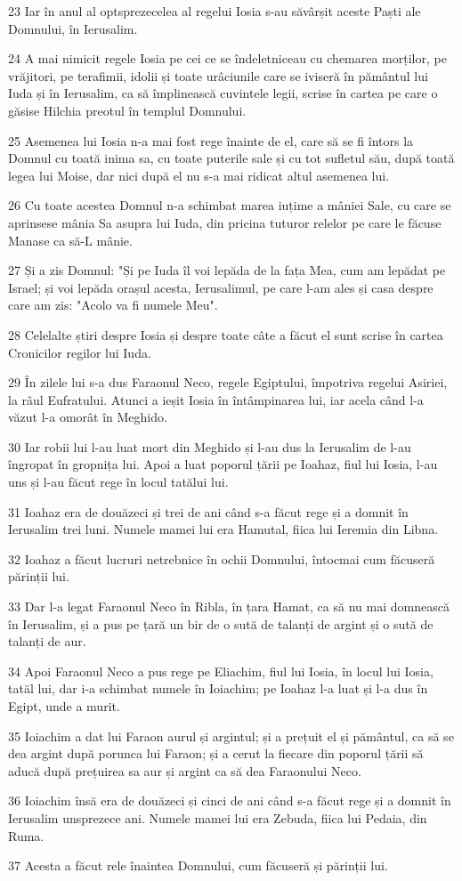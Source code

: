 \par 23 Iar în anul al optsprezecelea al regelui Iosia s-au săvârșit aceste Paști ale Domnului, în Ierusalim.
\par 24 A mai nimicit regele Iosia pe cei ce se îndeletniceau cu chemarea morților, pe vrăjitori, pe terafimii, idolii și toate urâciunile care se iviseră în pământul lui Iuda și în Ierusalim, ca să împlinească cuvintele legii, scrise în cartea pe care o găsise Hilchia preotul în templul Domnului.
\par 25 Asemenea lui Iosia n-a mai fost rege înainte de el, care să se fi întors la Domnul cu toată inima sa, cu toate puterile sale și cu tot sufletul său, după toată legea lui Moise, dar nici după el nu s-a mai ridicat altul asemenea lui.
\par 26 Cu toate acestea Domnul n-a schimbat marea iuțime a mâniei Sale, cu care se aprinsese mânia Sa asupra lui Iuda, din pricina tuturor relelor pe care le făcuse Manase ca să-L mânie.
\par 27 Și a zis Domnul: "Și pe Iuda îl voi lepăda de la fața Mea, cum am lepădat pe Israel; și voi lepăda orașul acesta, Ierusalimul, pe care l-am ales și casa despre care am zis: "Acolo va fi numele Meu".
\par 28 Celelalte știri despre Iosia și despre toate câte a făcut el sunt scrise în cartea Cronicilor regilor lui Iuda.
\par 29 În zilele lui s-a dus Faraonul Neco, regele Egiptului, împotriva regelui Asiriei, la râul Eufratului. Atunci a ieșit Iosia în întâmpinarea lui, iar acela când l-a văzut l-a omorât în Meghido.
\par 30 Iar robii lui l-au luat mort din Meghido și l-au dus la Ierusalim de l-au îngropat în gropnița lui. Apoi a luat poporul țării pe Ioahaz, fiul lui Iosia, l-au uns și l-au făcut rege în locul tatălui lui.
\par 31 Ioahaz era de douăzeci și trei de ani când s-a făcut rege și a domnit în Ierusalim trei luni. Numele mamei lui era Hamutal, fiica lui Ieremia din Libna.
\par 32 Ioahaz a făcut lucruri netrebnice în ochii Domnului, întocmai cum făcuseră părinții lui.
\par 33 Dar l-a legat Faraonul Neco în Ribla, în țara Hamat, ca să nu mai domnească în Ierusalim, și a pus pe țară un bir de o sută de talanți de argint și o sută de talanți de aur.
\par 34 Apoi Faraonul Neco a pus rege pe Eliachim, fiul lui Iosia, în locul lui Iosia, tatăl lui, dar i-a schimbat numele în Ioiachim; pe Ioahaz l-a luat și l-a dus în Egipt, unde a murit.
\par 35 Ioiachim a dat lui Faraon aurul și argintul; și a prețuit el și pământul, ca să se dea argint după porunca lui Faraon; și a cerut la fiecare din poporul țării să aducă după prețuirea sa aur și argint ca să dea Faraonului Neco.
\par 36 Ioiachim însă era de douăzeci și cinci de ani când s-a făcut rege și a domnit în Ierusalim unsprezece ani. Numele mamei lui era Zebuda, fiica lui Pedaia, din Ruma.
\par 37 Acesta a făcut rele înaintea Domnului, cum făcuseră și părinții lui.

